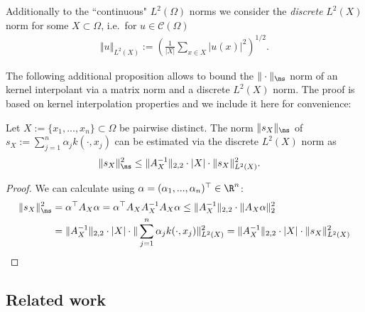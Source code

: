\documentclass[a4paper, 10pt]{article}
\begin{document}
Additionally to the ``continuous" $L^2(\Omega)$ norms we consider the \textit{discrete} $L^2(X)$ norm for some $X \subset \Omega$, i.e.\ for $u \in \mathcal{C}(\Omega)$ %
%
\begin{align}
\label{eq:discrete_L2_norm}
\Vert u \Vert_{L^2(X)} := \left( \frac{1}{|X|} \sum_{x \in X} |u(x)|^2 \right)^{1/2}.
\end{align}

The following additional proposition allows to bound the ${\Vert \cdot \Vert_{\ns}}$ norm of an kernel interpolant via a matrix norm and a discrete $L^2(X)$ norm.
The proof is based on kernel interpolation properties and we include it here for convenience:

\begin{prop}
\label{prop:upper_bound_ns_norm_via_L2}
Let $X := \{x_1, ..., x_n\} \subset \Omega$ be pairwise distinct. 
The norm $\Vert s_X \Vert_{\ns}$ of $s_X := \sum_{j=1}^n \alpha_j k(\cdot, x_j)$ can be estimated via the discrete $L^2(X)$ norm as
\begin{align*}
\Vert s_X \Vert_{\ns}^2 &\leq \Vert A_X^{-1} \Vert_{2,2} \cdot |X| \cdot \Vert s_X \Vert_{L^2(X)}^2.
\end{align*}
\end{prop}

\begin{proof}
We can calculate using $\alpha = (\alpha_1, ..., \alpha_n)^\top \in \R^n$:
\begin{align*}
\Vert s_X \Vert_{\ns}^2 &= \alpha^\top A_{X} \alpha = \alpha^\top A_{X} A_{X}^{-1} A_{X} \alpha 
\leq \Vert A_X^{-1} \Vert_{2,2} \cdot \Vert A_X \alpha \Vert_{2}^2 \\
& = \Vert A_X^{-1} \Vert_{2,2} \cdot |X| \cdot \Vert \sum_{j=1}^n \alpha_j k(\cdot, x_j) \Vert_{L^2(X)}^2 = \Vert A_X^{-1} \Vert_{2,2} \cdot |X| \cdot \Vert s_X \Vert_{L^2(X)}^2
\end{align*}
\end{proof}




%

%
%
%
%
%
%
%
%
%
%
%
%
%
%
%
%
%
%
%





%
%
%
%
%
%
%


%
%
%
%
%
%
%
%
%
%
%
%
%
%
%
%
%
%
%
%
%
%
%
%
%
%
%
%
%
%
%
%
%
%
%
%
%
%
%
%
%
%
%
%
%
%
%
%
%
%
%
%
%
%
%
%
%
%
%
%
%
%
%
%
%
%
%
%
%
%
%
%
%


%
\subsection{Related work} \label{subsec:related_work}
\end{document}
